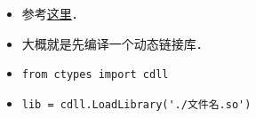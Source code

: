 
\begin{issues}
\issueDraft
\end{issues}

\begin{itemize}
\item 参考\href{https://www.geeksforgeeks.org/how-to-call-c-c-from-python/}{这里}．
\item 大概就是先编译一个动态链接库．
\item \verb|from ctypes import cdll|
\item \verb|lib = cdll.LoadLibrary('./文件名.so')|
\it
\end{itemize}
